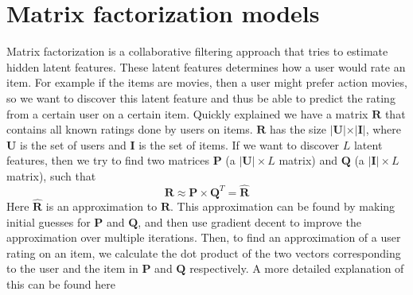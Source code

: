 \section{Matrix factorization models}
Matrix factorization is a collaborative filtering approach that tries to estimate hidden latent features. These latent features determines how a user would rate an item. For example if the items are movies, then a user might prefer action movies, so we want to discover this latent feature and thus be able to predict the rating from a certain user on a certain item. Quickly explained we have a matrix $\textbf{R}$ that contains all known ratings done by users on items. $\textbf{R}$ has the size $\vert \textbf{U} \vert \times \vert \textbf{I} \vert$, where $\textbf{U}$ is the set of users and $\textbf{I}$ is the set of items. If we want to discover $L$ latent features, then we try to find two matrices $\textbf{P}$ (a $\vert \textbf{U} \vert \times L$ matrix) and $\textbf{Q}$ (a $\vert \textbf{I} \vert \times L$ matrix), such that
$$ \textbf{R} \approx \textbf{P} \times \textbf{Q}^T = \hat{\textbf{R}}$$
Here $\hat{\textbf{R}}$ is an approximation to $\textbf{R}$. This approximation can be found by making initial guesses for $\textbf{P}$ and $\textbf{Q}$, and then use gradient decent to improve the approximation over multiple iterations. Then, to find an approximation of a user rating on an item, we calculate the dot product of the two vectors corresponding to the user and the item in $\textbf{P}$ and $\textbf{Q}$ respectively. A more detailed explanation of this can be found here \cite{QUUX:matrix-factorization-tutorial}

